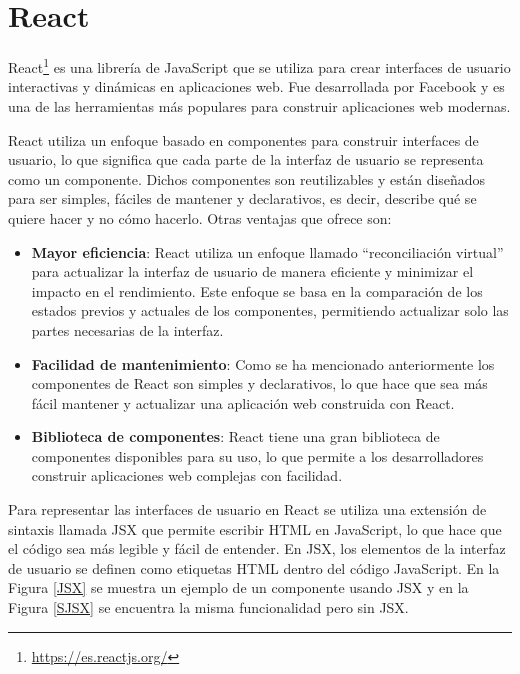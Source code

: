 \section{React}\label{sec:React}
React\footnote{\url{https://es.reactjs.org/}} es una librería de JavaScript que se utiliza para crear interfaces de usuario interactivas y dinámicas en aplicaciones web. Fue desarrollada por Facebook y es una de las herramientas más populares para construir aplicaciones web modernas.

React utiliza un enfoque basado en componentes para construir interfaces de usuario, lo que significa que cada parte de la interfaz de usuario se representa como un componente. Dichos componentes son reutilizables y están diseñados para ser simples, fáciles de mantener y declarativos, es decir, describe qué se quiere hacer y no cómo hacerlo. Otras ventajas que ofrece son:

\begin{itemize}
    \item \textbf{Mayor eficiencia}: React utiliza un enfoque llamado ``reconciliación virtual'' para actualizar la interfaz de usuario de manera eficiente y minimizar el impacto en el rendimiento. Este enfoque se basa en la comparación de los estados previos y actuales de los componentes, permitiendo actualizar solo las partes necesarias de la interfaz.
    \item \textbf{Facilidad de mantenimiento}: Como se ha mencionado anteriormente los componentes de React son simples y declarativos, lo que hace que sea más fácil mantener y actualizar una aplicación web construida con React.
   \item \textbf{Biblioteca de componentes}: React tiene una gran biblioteca de componentes disponibles para su uso, lo que permite a los desarrolladores construir aplicaciones web complejas con facilidad.
\end{itemize}

Para representar las interfaces de usuario en React se utiliza una extensión de sintaxis llamada JSX que permite escribir HTML en JavaScript, lo que hace que el código sea más legible y fácil de entender. En JSX, los elementos de la interfaz de usuario se definen como etiquetas HTML dentro del código JavaScript. En la Figura \ref{JSX} se muestra un ejemplo de un componente usando JSX y en la Figura \ref{SJSX} se encuentra la misma funcionalidad pero sin JSX.

